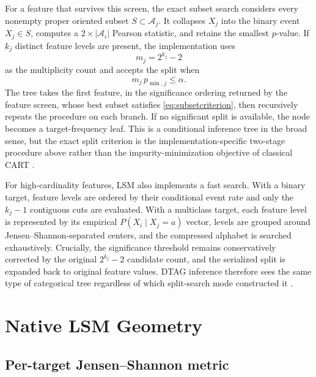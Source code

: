 \documentclass[journal]{IEEEtran}
\newcommand{\A}{\mathcal{A}}
\newcommand{\1}{\mathbf{1}}
\begin{document}
For a feature that survives this screen, the exact subset search considers every nonempty proper oriented subset $S\subset\A_j$. It collapses $X_j$ into the binary event $X_j\in S$, computes a $2\times |\A_i|$ Pearson statistic, and retains the smallest $p$-value. If $k_j$ distinct feature levels are present, the implementation uses
\begin{equation}
  m_j=2^{k_j}-2
\end{equation}
as the multiplicity count and accepts the split when
\begin{equation}
  m_j\,p_{\min,j}\le\alpha.
  \label{eq:subsetcriterion}
\end{equation}
The tree takes the first feature, in the significance ordering returned by the feature screen, whose best subset satisfies \eqref{eq:subsetcriterion}, then recursively repeats the procedure on each branch. If no significant split is available, the node becomes a target-frequency leaf. This is a conditional inference tree in the broad sense, but the exact split criterion is the implementation-specific two-stage procedure above rather than the impurity-minimization objective of classical CART \cite{breiman1984cart,lsm2026}.

For high-cardinality features, LSM also implements a fast search. With a binary target, feature levels are ordered by their conditional event rate and only the $k_j-1$ contiguous cuts are evaluated. With a multiclass target, each feature level is represented by its empirical $P(X_i\mid X_j=a)$ vector, levels are grouped around Jensen--Shannon-separated centers, and the compressed alphabet is searched exhaustively. Crucially, the significance threshold remains conservatively corrected by the original $2^{k_j}-2$ candidate count, and the serialized split is expanded back to original feature values. DTAG inference therefore sees the same type of categorical tree regardless of which split-search mode constructed it \cite{lsm2026}.

\section{Native LSM Geometry}
\label{sec:geometry}

\subsection{Per-target Jensen--Shannon metric}
\end{document}
